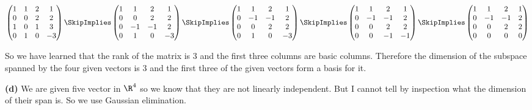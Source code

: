 \documentclass[oneside,12pt]{amsart}
\begin{document}
$
\begin{pmatrix}
1 & 1 & 2 & 1 \\
0 & 0 & 2 & 2 \\
1 & 0 & 1 & 3 \\
0 & 1 & 0 & -3
\end{pmatrix}
\SkipImplies
\begin{pmatrix}
1 & 1 & 2 & 1 \\
0 & 0 & 2 & 2 \\
0 & -1 & -1 & 2 \\
0 & 1 & 0 & -3
\end{pmatrix}
\SkipImplies
\begin{pmatrix}
1 & 1 & 2 & 1 \\
0 & -1 & -1 & 2 \\
0 & 0 & 2 & 2 \\
0 & 1 & 0 & -3
\end{pmatrix}
\SkipImplies
\begin{pmatrix}
1 & 1 & 2 & 1 \\
0 & -1 & -1 & 2 \\
0 & 0 & 2 & 2 \\
0 & 0 & -1 & -1
\end{pmatrix}
\SkipImplies
\begin{pmatrix}
1 & 1 & 2 & 1 \\
0 & -1 & -1 & 2 \\
0 & 0 & 2 & 2 \\
0 & 0 & 0 & 0
\end{pmatrix}
$

So we have learned that the rank of the matrix is 3 and the first three columns
are basic columns. Therefore the dimension of the subspace spanned by the
four given vectors is 3 and the first three of the given vectors form a basis for it.

\bigskip

\textbf{(d)} We are given five vector in $\R^4$ so we know that they are not
linearly independent. But I cannot tell by inspection what the dimension of
their span is. So we use Gaussian elimination.
\end{document}
